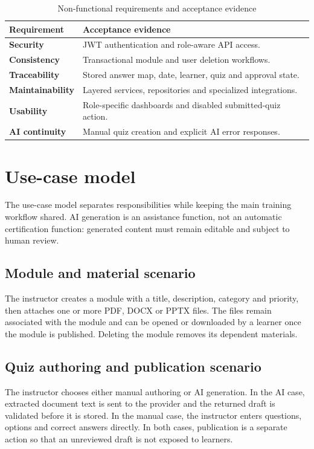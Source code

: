 \begin{table}[H]\centering
\caption{Non-functional requirements and acceptance evidence}
\label{tab:nonfunctional}
\begin{tabularx}{\textwidth}{>{\bfseries}p{}X}
\toprule Requirement & Acceptance evidence\\\midrule
Security & JWT authentication and role-aware API access.\\
Consistency & Transactional module and user deletion workflows.\\
Traceability & Stored answer map, date, learner, quiz and approval state.\\
Maintainability & Layered services, repositories and specialized integrations.\\
Usability & Role-specific dashboards and disabled submitted-quiz action.\\
AI continuity & Manual quiz creation and explicit AI error responses.\\
\bottomrule
\end{tabularx}
\end{table}

\section{Use-case model}
The use-case model separates responsibilities while keeping the main training
workflow shared. AI generation is an assistance function, not an automatic
certification function: generated content must remain editable and subject to
human review.

\subsection{Module and material scenario}
The instructor creates a module with a title, description, category and
priority, then attaches one or more PDF, DOCX or PPTX files. The files remain
associated with the module and can be opened or downloaded by a learner once
the module is published. Deleting the module removes its dependent materials.

\subsection{Quiz authoring and publication scenario}
The instructor chooses either manual authoring or AI generation. In the AI
case, extracted document text is sent to the provider and the returned draft
is validated before it is stored. In the manual case, the instructor enters
questions, options and correct answers directly. In both cases, publication
is a separate action so that an unreviewed draft is not exposed to learners.

